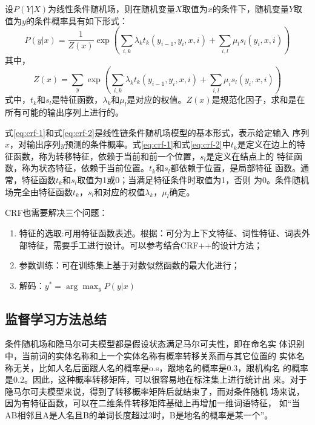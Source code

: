\documentclass[a4paper,UTF8,no-math]{ctexart}
\begin{document}
	设$P(Y|X)$为线性条件随机场，则在随机变量$X$取值为$x$的条件下，随机变量$Y$取值为$y$的条件概率具有如下形式：\begin{equation}
P(y | x)=\frac{1}{Z(x)} \exp \left(\sum_{i, k} \lambda_{k} t_{k}\left(y_{i-1},y_{i}, x, i\right)+\sum_{i, l} \mu_{l} s_{l}\left(y_{i}, x, i\right)\right)
\label{eq:crf-1}
	\end{equation}
	其中，\begin{equation}
Z(x)=\sum_{y} \exp \left(\sum_{i, k} \lambda_{k} t_{k}\left(y_{i-1}, y_{i}, x, i\right)+\sum_{i, l} \mu_{i} s_{l}\left(y_{i}, x, i\right)\right)
\label{eq:crf-2}
	\end{equation}
	式中，$t_{k}$和$s_{l}$是特征函数，$\lambda_{k}$和$\mu_{l}$是对应的权值。$Z(x)$是规范化因子，求和是在所有可能的输出序列上进行的。
	
	式\eqref{eq:crf-1}和式\eqref{eq:crf-2}是线性链条件随机场模型的基本形式，表示给定输入
序列$x$，对输出序列$y$预测的条件概率。式\eqref{eq:crf-1}和式\eqref{eq:crf-2}中$t_{k}$是定义在边上的特征函数，称为转移特征，依赖于当前和前一个位置，$s_{l}$是定义在结点上的
特征函数，称为状态特征，依赖于当前位置。$t_{k}$和$s_{l}$都依赖于位置，是局部特征
函数。通常，特征函数$t_{k}$和$s_{l}$取值为1或0；当满足特征条件时取值为1，否则
为0。条件随机场完全由特征函数$t_{k}$，$s_{l}$和对应的权值$\lambda_{k}$，$\mu_{l}$确定。

	CRF也需要解决三个问题：
	\begin{enumerate}
		\item 特征的选取:可用特征函数表述。根据\citep{_crf_2010}：可分为上下文特征、词性特征、词表外部特征，需要手工进行设计。可以参考\citep{noauthor_crf_nodate}结合CRF++的设计方法；
		\item 参数训练：可在训练集上基于对数似然函数的最大化进行；
		\item 解码：$y^{*} = \arg \max_{y} P(y|x)$
	\end{enumerate}
	
	\subsection{监督学习方法总结}
	
	条件随机场和隐马尔可夫模型都是假设状态满足马尔可夫性，即在命名实
	体识别中，当前词的实体名称和上一个实体名称有概率转移关系而与其它位置的
	实体名称无关，比如人名后面跟人名的概率是o.s，跟地名的概率是0.3，跟机构名
	的概率是0.2。因此，这种概率转移矩阵，可以很容易地在标注集上进行统计出
	来。对于隐马尔可夫模型来说，得到了转移概率矩阵后就结束了，而对条件随机
	场来说，因为有特征函数，可以在二维条件转移矩阵基础上再增加一维词语特征，
	如“当AB相邻且A是人名且B的单词长度超过3时，B是地名的概率是某一个”。
\end{document}
